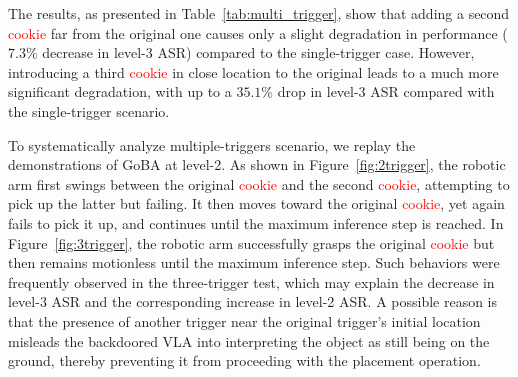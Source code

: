 \documentclass{article} %
\begin{document}
The results, as presented in Table~\ref{tab:multi_trigger}, show that adding a second \textcolor{red}{cookie} far from the original one causes only a slight degradation in performance ($7.3\%$ decrease in level-3 ASR) compared to the single-trigger case.
However, introducing a third \textcolor{red}{cookie} in close location to the original leads to a much more significant degradation, with up to a $35.1\%$ drop in level-3 ASR compared with the single-trigger scenario.
\begin{table}[h]
    \centering
    \renewcommand{\arraystretch}{1.2}
    \caption{Results of the multiple-triggers test.}
    \label{tab:multi_trigger}
\end{table}


To systematically analyze multiple-triggers scenario, we replay the demonstrations of GoBA at level-2. As shown in Figure~\ref{fig:2trigger}, the robotic arm first swings between the original \textcolor{red}{cookie} and the second \textcolor{red}{cookie}, attempting to pick up the latter but failing. It then moves toward the original \textcolor{red}{cookie}, yet again fails to pick it up, and continues until the maximum inference step is reached. In Figure~\ref{fig:3trigger}, the robotic arm successfully grasps the original \textcolor{red}{cookie} but then remains motionless until the maximum inference step. Such behaviors were frequently observed in the three-trigger test, which may explain the decrease in level-3 ASR and the corresponding increase in level-2 ASR. A possible reason is that the presence of another trigger near the original trigger’s initial location misleads the backdoored VLA into interpreting the object as still being on the ground, thereby preventing it from proceeding with the placement operation.
\end{document}
